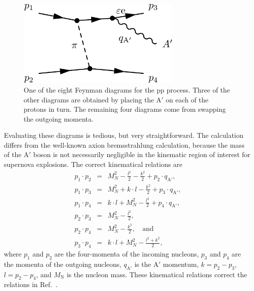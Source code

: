 \documentclass[nofootinbib,prd,superscriptaddress,twocolumn]{revtex4}
\newcommand{\bea}{\begin{eqnarray}}
\newcommand{\eea}{\end{eqnarray}}
\newcommand{\qa}{q_{\mathrm{A}'}}
\newcommand{\Aprime}{\mathrm{A}'}
\begin{document}
\begin{figure}
\includegraphics[width=8cm]{ppdiagram.pdf}
\caption{One of the eight Feynman diagrams for the pp process. Three of the other diagrams are obtained by 
placing the $\Aprime$ on each of the protons in turn. The remaining four diagrams come from swapping the outgoing 
momenta.}
\label{fig:ppdiagram}
\end{figure}
	
Evaluating these diagrams is tedious, but very straightforward. The calculation differs 
from the well-known axion bremsstrahlung calculation, because the mass of the $\Aprime$ boson is not 
necessarily negligible in the kinematic region of interest for supernova explosions.
The correct kinematical relations are 
%
\bea 
p_1 \cdot p_2 &=& M_N^2 - \frac{l^2}{2} - \frac{k^2}{2} + p_2 \cdot \qa,\\
p_1 \cdot p_3 &=& M_N^2 + k \cdot l - \frac{k^2}{2} + p_3 \cdot \qa,\\  
p_1 \cdot p_4 &=& k \cdot l + M_N^2 - \frac{l^2}{2} + p_4 \cdot \qa, \\
p_2 \cdot p_3 &=& M_N^2 - \frac{l^2}{2}, \\ 
p_2 \cdot p_4 &=& M_N^2 - \frac{k^2}{2},\quad \mathrm{and}\\
p_3 \cdot p_4 &=& k \cdot l + M_N^2 - \frac{l^2 + k^2}{2},
\eea
%
where $p_1$ and $p_2$ are the four-momenta of the incoming nucleons, $p_3$ and $p_4$ are the momenta 
of the outgoing nucleons, $\qa$ is the $\Aprime$ momentum, $k=p_2 - p_3$, $l=p_2 - p_4$, and $M_{\mathrm{N}}$ 
is the nucleon mass. These kinematical relations correct the relations in Ref.~\cite{dent_etal12}.
\end{document}
